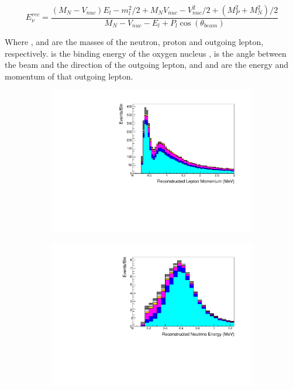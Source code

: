 \begin{equation}
  \label{sec:SelsAndSysts_Erec_CCQE}
  E^{rec}_{\nu} = \frac{(M_{N}-V_{nuc})E_{l} - m_{l}^{2}/2 + M_{N}V_{nuc} - V_{nuc}^{2}/2 + (M_{P}^{2} + M_{N}^{2})/2}{M_{N} - V_{nuc} - E_{l} + P_{l}\cos(\theta_{beam})}
\end{equation}

Where ,  and  are the masses of the neutron, proton and outgoing lepton, respectively.  is the binding energy of the oxygen nucleus \cite{t2k_tn_399},  is the angle between the beam and the direction of the outgoing lepton, and  and  are the energy and momentum of that outgoing lepton.

\begin{figure}[h]
  \begin{subfigure}[t]{0.49\textwidth}
    \includegraphics[width=\textwidth, trim={0mm 0mm 0mm 0mm}, clip,page=1]{Figures/Selections/FHC1Rmu-2020_X.pdf}
  \end{subfigure}%
  \begin{subfigure}[t]{0.49\textwidth}
    \includegraphics[width=\textwidth, trim={0mm 0mm 0mm 0mm}, clip,page=1]{Figures/Selections/FHC1Re-2020_X.pdf}

\end{subfigure}
\end{figure}
